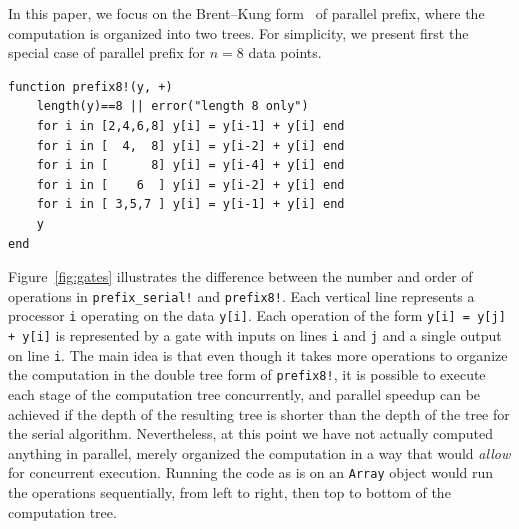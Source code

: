 \documentclass{sig-alternate}
\newcommand{\code}[1]{\texttt{#1}}
\begin{document}
In this paper, we focus on the Brent--Kung form~\cite{Brent1982} of parallel
prefix, where the computation is organized into two trees. For simplicity, we
present first the special case of parallel prefix for $n=8$ data points.

\begin{verbatim}
function prefix8!(y, +)
    length(y)==8 || error("length 8 only")
    for i in [2,4,6,8] y[i] = y[i-1] + y[i] end
    for i in [  4,  8] y[i] = y[i-2] + y[i] end
    for i in [      8] y[i] = y[i-4] + y[i] end
    for i in [    6  ] y[i] = y[i-2] + y[i] end
    for i in [ 3,5,7 ] y[i] = y[i-1] + y[i] end
    y
end
\end{verbatim}

Figure~\ref{fig:gates} illustrates the difference between the number and order
of operations in \code{prefix\allowbreak\_serial!} and \code{prefix8!}. Each vertical line
represents a processor \code{i} operating on the data \code{y[i]}. Each
operation of the form \code{y[i] = y[j] + y[i]} is represented by a gate with
inputs on lines \code{i} and \code{j} and a single output on line \code{i}. The
main idea is that even though it takes more operations to organize the
computation in the double tree form of \code{prefix8!}, it is possible to
execute each stage of the computation tree concurrently, and parallel speedup
can be achieved if the depth of the resulting tree is shorter than the depth of
the tree for the serial algorithm. Nevertheless, at this point we have not
actually computed anything in parallel, merely organized the computation in a
way that would \textit{allow} for concurrent execution. Running the code as is
on an \code{Array} object would run the operations sequentially, from left to
right, then top to bottom of the computation tree. 
\end{document}

